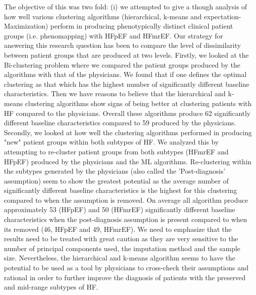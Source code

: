 \documentclass[../thesis.tex]{subfiles}
\begin{document}
\noindent The objective of this was two fold: (i) we attempted to give a though analysis of how well various clustering algorithms (hierarchical, k-means and expectation-Maximization) perform in producing phenotypically distinct clinical patient groups (i.e. phenomapping) with HFpEF and HFmrEF. Our strategy for answering this research question has been to compare the level of dissimilarity between patient groups that are produced at two levels. Firstly, we looked at the Bi-clustering problem where we compared the patient groups produced by the algorithms with that of the physicians. We found that if one defines the optimal clustering as that which has the highest number of significantly different baseline characteristics. Then we have reasons to believe that the hierarchical and k-means clustering algorithms show signs of being better at clustering patients with HF compared to the physicians. Overall these algorithms produce 62 significantly different baseline characteristics compared to 59 produced by the physicians. Secondly, we looked at how well the clustering algorithms performed in producing "new" patient groups within both subtypes of HF. We analyzed this by attempting to re-cluster patient groups from both subtypes (HFmrEF and HFpEF) produced by the physicians and the ML algorithms. Re-clustering within the subtypes generated by the physicians (also called the 'Post-diagnosis' assumption) seem to show the greatest potential as the average number of significantly different baseline characteristics is the highest for this clustering compared to when the assumption is removed. On average all algorithm produce approximately 53 (HFpEF) and 50 (HFmrEF) significantly different baseline characteristics when the post-diagnosis assumption is present compared to when its removed (46, HFpEF and 49, HFmrEF). We need to emphasize that the results need to be treated with great caution as they are very sensitive to the number of principal components used, the imputation method and the sample size. Nevertheless, the hierarchical and k-means algorithm seems to have the potential to be used as a tool by physicians to cross-check their assumptions and rational in order to further improve the diagnosis of patients with the preserved and mid-range subtypes of HF.\\
\end{document}

